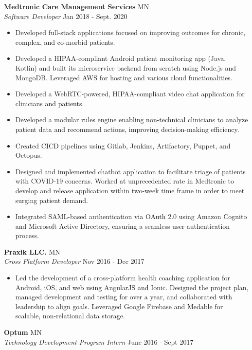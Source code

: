 \documentclass[a4paper]{article}
\begin{document}
\textbf{Medtronic Care Management Services} \hfill MN\\
\textit{Software Developer} \hfill Jan 2018 - Sept. 2020\\
\vspace{-1mm}
\begin{itemize} \itemsep 1pt
    \item Developed full-stack applications focused on improving outcomes for chronic, complex, and co-morbid patients.
    \item Developed a HIPAA-compliant Android patient monitoring app (Java, Kotlin) and built its microservice backend from scratch using Node.js and MongoDB. Leveraged AWS for hosting and various cloud functionalities.
        \item Developed a WebRTC-powered, HIPAA-compliant video chat application for clinicians and patients.
    \item Developed a modular rules engine enabling non-technical clinicians to analyze patient data and recommend actions, improving decision-making efficiency.
    \item Created CICD pipelines using Gitlab, Jenkins, Artifactory, Puppet, and Octopus.
    \item Designed and implemented chatbot application to facilitate triage of patients with COVID-19 concerns. Worked at unprecedented rate in Medtronic to develop and release application within two-week time frame in order to meet surging patient demand.
    \item Integrated SAML-based authentication via OAuth 2.0 using Amazon Cognito and Microsoft Active Directory, ensuring a seamless user authentication process.
\end{itemize}
\pagebreak
\textbf{Praxik LLC.} \hfill MN\\
\textit{Cross Platform Developer} \hfill Nov 2016 - Dec 2017\\
\vspace{-1mm}
\begin{itemize} \itemsep 1pt
    \item Led the development of a cross-platform health coaching application for Android, iOS, and web using AngularJS and Ionic. Designed the project plan, managed development and testing for over a year, and collaborated with leadership to align goals. Leveraged Google Firebase and Medable for scalable, non-relational data storage.
\end{itemize}
\textbf{Optum} \hfill MN\\
\textit{Technology Development Program Intern} \hfill June 2016 - Sept 2017\\
\end{document}
